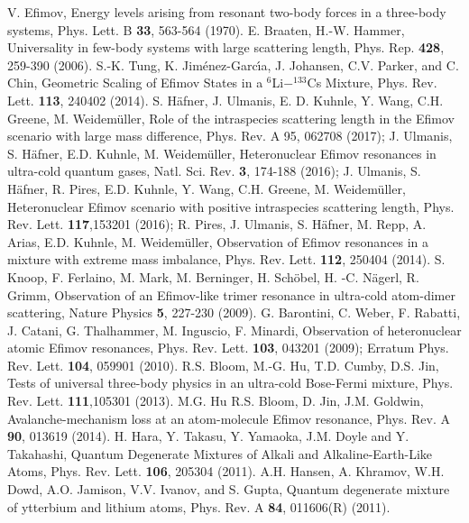 \documentclass[twocolumn,amsmath,amssymb,epsfig,aps,prl]{revtex4}
\begin{document}
\begin{thebibliography}{40}
 V. Efimov, Energy levels arising from resonant two-body forces in a three-body systems, 
Phys. Lett. B {\bf 33}, 563-564 (1970).
  E. Braaten, H.-W. Hammer, Universality in few-body systems with large scattering length, 
 Phys. Rep. {\bf 428}, 259-390 (2006). 
 S.-K. Tung, K. Jim\'enez-Garc\'\i a, J. Johansen, C.V. Parker, and C. Chin,
 Geometric Scaling of Efimov States in a $^{6}$Li$-^{133}$Cs Mixture, 
 Phys. Rev. Lett. {\bf 113}, 240402 (2014).
S. H\"afner, J. Ulmanis, E. D. Kuhnle, Y. Wang, C.H. Greene, M. Weidem\"uller, 
Role of the intraspecies scattering length in the Efimov scenario with large mass difference, Phys. Rev. A 95, 062708 (2017);
J. Ulmanis, S. H\"afner, E.D. Kuhnle, M. Weidem\"uller, Heteronuclear Efimov
resonances in ultra-cold quantum gases, Natl. Sci. Rev. {\bf 3}, 174-188 (2016);
J. Ulmanis, S. H\"afner, R. Pires, E.D. Kuhnle, Y. Wang, C.H. Greene, M. Weidem\"uller, Heteronuclear Efimov
scenario with positive intraspecies scattering length, Phys. Rev. Lett. {\bf 117},153201  (2016);
R. Pires, J. Ulmanis, S. H\"afner, M. Repp, A. Arias, E.D. Kuhnle, M. Weidem\"uller, Observation of Efimov
resonances in a mixture with extreme mass imbalance, Phys. Rev. Lett. {\bf 112}, 250404  (2014).
 S. Knoop, F. Ferlaino, M. Mark, M. Berninger, H. Sch\"obel, H. -C. N\"agerl, R. Grimm, 
Observation of an Efimov-like trimer resonance in ultra-cold atom-dimer scattering, Nature Physics 
{\bf 5}, 227-230 (2009). 
 G. Barontini, C. Weber, F. Rabatti, J. Catani, G. Thalhammer, M. Inguscio, 
F. Minardi, Observation of heteronuclear atomic Efimov resonances,
Phys. Rev. Lett. {\bf 103}, 043201 (2009); Erratum Phys. Rev. Lett. {\bf 104}, 059901 (2010).
 R.S. Bloom, M.-G. Hu, T.D. Cumby, D.S. Jin, 
Tests of universal three-body physics in an ultra-cold Bose-Fermi mixture, 
Phys. Rev. Lett. {\bf 111},105301  (2013).
 M.G. Hu R.S. Bloom, D. Jin, J.M. Goldwin, Avalanche-mechanism loss at an atom-molecule
Efimov resonance, Phys. Rev. A {\bf 90}, 013619  (2014).
 H. Hara, Y. Takasu, Y. Yamaoka, J.M. Doyle and Y. Takahashi, 
Quantum Degenerate Mixtures of Alkali and Alkaline-Earth-Like Atoms, Phys. Rev. Lett. {\bf 106}, 205304 (2011).
 A.H. Hansen, A. Khramov, W.H. Dowd, A.O. Jamison, V.V. Ivanov, and S. Gupta,
Quantum degenerate mixture of ytterbium and lithium atoms, Phys. Rev. A {\bf 84}, 011606(R) (2011).

\end{thebibliography}
\end{document}
